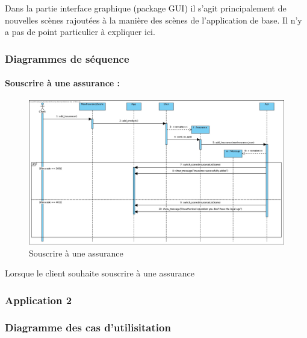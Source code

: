 \documentclass[../rapport.tex]{subfiles}
\begin{document}
		\bigskip

		Dans la partie interface graphique (package GUI) il s'agit principalement de nouvelles 
		scènes rajoutées à la manière des scènes de l'application de base. Il n'y a pas de 
		point particulier à expliquer ici.
		
		\subsubsection{Diagrammes de séquence}
				\paragraph{Souscrire à une assurance :}
						\begin{figure}[h]
								\centering\includegraphics[scale=0.4]{ressources/photos_diagrammes/extensionThomas/souscrireAssurance.jpg}
								\caption{Souscrire à une assurance}
						\end{figure}
					Lorsque le client souhaite souscrire à une assurance 			
		\subsubsection{Application 2}

		\subsubsection{Diagramme des cas d'utilisitation}
\end{document}
